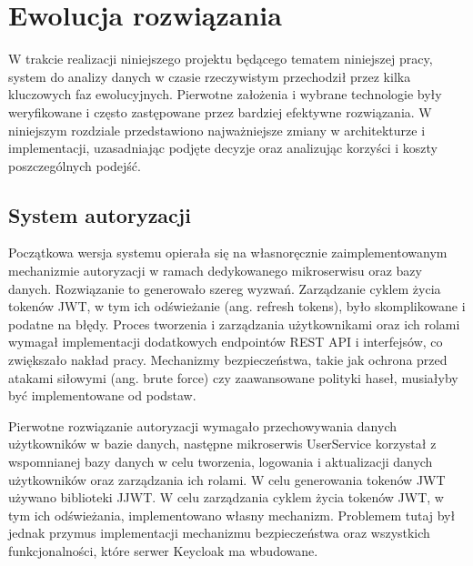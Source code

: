 \section{Ewolucja rozwiązania}
\label{chap:ewolucja_rozwiazania}


W trakcie realizacji niniejszego projektu będącego tematem niniejszej pracy, system do analizy danych w czasie rzeczywistym przechodził przez kilka kluczowych faz ewolucyjnych. Pierwotne założenia i wybrane technologie były weryfikowane i często zastępowane przez bardziej efektywne rozwiązania. W niniejszym rozdziale przedstawiono najważniejsze zmiany w architekturze i implementacji, uzasadniając podjęte decyzje oraz analizując korzyści i koszty poszczególnych podejść.

\subsection{System autoryzacji}

Początkowa wersja systemu opierała się na własnoręcznie zaimplementowanym mechanizmie autoryzacji w ramach dedykowanego mikroserwisu oraz bazy danych. Rozwiązanie to generowało szereg wyzwań. Zarządzanie cyklem życia tokenów JWT, w tym ich odświeżanie (ang. refresh tokens), było skomplikowane i podatne na błędy. Proces tworzenia i zarządzania użytkownikami oraz ich rolami wymagał implementacji dodatkowych endpointów REST API i interfejsów, co zwiększało nakład pracy. Mechanizmy bezpieczeństwa, takie jak ochrona przed atakami siłowymi (ang. brute force) czy zaawansowane polityki haseł, musiałyby być implementowane od podstaw.

Pierwotne rozwiązanie autoryzacji wymagało przechowywania danych użytkowników w bazie danych, następne mikroserwis UserService korzystał z wspomnianej bazy danych w celu tworzenia, logowania i aktualizacji danych użytkowników oraz zarządzania ich rolami. W celu generowania tokenów JWT używano biblioteki JJWT. W celu zarządzania cyklem życia tokenów JWT, w tym ich odświeżania, implementowano własny mechanizm. Problemem tutaj był jednak przymus implementacji mechanizmu bezpieczeństwa oraz wszystkich funkcjonalności, które serwer Keycloak ma wbudowane.

\vspace{0.3em}

